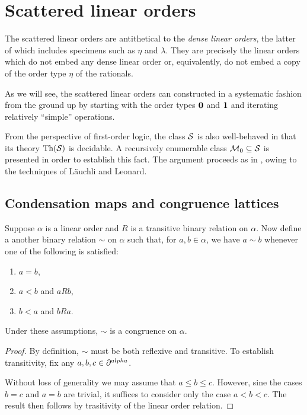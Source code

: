 

\chapter{Scattered linear orders}

The scattered linear orders are antithetical to the \textit{dense linear
orders}, the latter of which includes specimens such as $\eta$ and $\lambda$.
They are precisely the linear orders which do not embed any dense linear order
or, equivalently, do not embed a copy of the order type $\eta$ of the
rationals.

As we will see, the scattered linear orders can constructed in a systematic
fashion from the ground up by starting with the order types $\mathbf{0}$ and $\mathbf{1}$
and iterating relatively ``simple'' operations.

From the perspective of first-order logic, the class $\mathcal{S}$ is also
well-behaved in that its theory $\operatorname{Th}(\mathcal{S})$ is decidable.  A recursively
enumerable class $\mathcal{M}_0\subseteq\mathcal{S}$ is presented in order to establish
this fact.  The argument proceeds as in \cite{RosLin}, owing to the techniques
of L\"auchli and Leonard.

\section{Condensation maps and congruence lattices}

\begin{lem}
	\label{lem:IndCong}
	Suppose $\alpha$ is a linear order and $R$ is a transitive binary relation
	on $\alpha$.  Now define a another binary relation $\sim$ on $\alpha$ such
	that, for $a,b\in\alpha$, we have $a\sim b$ whenever one of the following
	is satisfied:
	\begin{enumerate}
		\item   $a=b$,
		\item   $a<b$ and $aRb$,
		\item   $b<a$ and $bRa$.
	\end{enumerate}
	Under these assumptions, $\sim$ is a congruence on $\alpha$.
\end{lem}
\begin{proof}
	By definition, $\sim$ must be both reflexive and transitive.  To establish
	transitivity, fix any $a,b,c\in\partial^{alpha}$.

	Without loss of generality we may assume that $a\leq b\leq c$.  However,
	sine the cases $b=c$ and $a=b$ are trivial, it suffices to consider only the
	case $a<b<c$.  The result then follows by trasitivity of the linear order
	relation.
\end{proof}

